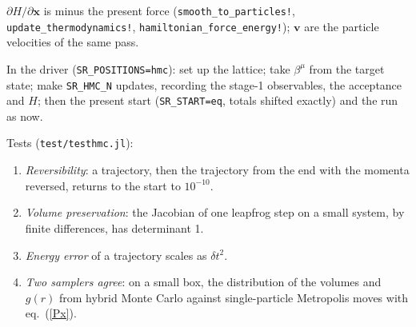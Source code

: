 \documentclass[11pt,aps,preprint,nofootinbib,superscriptaddress,tightenlines]{revtex4-2}
\def\Eq#1{eq.~(\ref{#1})}
\begin{document}
\noindent{}
\medskip

$\partial H/\partial\bm x$ is minus the present force (\texttt{smooth\_to\_particles!}, \texttt{update\_thermodynamics!},
\texttt{hamiltonian\_force\_energy!}); $\bm v$ are the particle velocities of the same pass.

In the driver (\texttt{SR\_POSITIONS=hmc}): set up the lattice; take $\beta^\mu$ from the target state; make \texttt{SR\_HMC\_N}
updates, recording the stage-1 observables, the acceptance and $H$; then the present start (\texttt{SR\_START=eq}, totals
shifted exactly) and the run as now.

Tests (\texttt{test/testhmc.jl}):
\begin{enumerate}
\item \emph{Reversibility}: a trajectory, then the trajectory from the end with the momenta reversed, returns to the start
  to $10^{-10}$.
\item \emph{Volume preservation}: the Jacobian of one leapfrog step on a small system, by finite differences, has
  determinant 1.
\item \emph{Energy error} of a trajectory scales as $\delta t^2$.
\item \emph{Two samplers agree}: on a small box, the distribution of the volumes and $g(r)$ from hybrid Monte Carlo against
  single-particle Metropolis moves with \Eq{Px}.
\end{enumerate}
\end{document}
